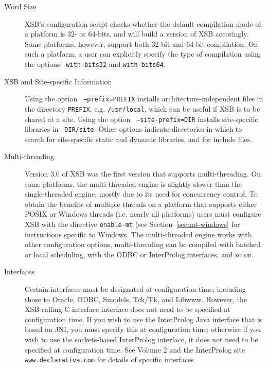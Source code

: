 \begin{description}
\item[Word Size] XSB's configuration script checks whether the default
  compilation mode of a platform is 32- or 64-bits, and will build a
  version of XSB accoringly.  Some platforms, however, support both
  32-bit and 64-bit compilation.  On such a platform, a user can
  explicitly specify the type of compilation using the options {\tt
    with-bits32} and {\tt with-bits64}.  

\item[XSB and Site-specific Information] Using the option {\tt
  --prefix=PREFIX} installs architecture-independent files in the
  directory {\tt PREFIX}, e.g. {\tt /usr/local}, which can be useful
  if XSB is to be shared at a site.  Using the option {\tt
    --site-prefix=DIR} installs site-specific libraries in {\tt
    DIR/site}.  Other options indicate directories in which to search
  for site-specific static and dynamic libraries, and for include
  files.

\item[Multi-threading] Version 3.0 of XSB was the first version that
  supports multi-threading.  On some platforms, the multi-threaded
  engine is slightly slower than the single-threaded engine, mostly
  due to its need for concurrency control.  To obtain the benefits of
  multiple threads on a platform that supports either POSIX or Windows
  threads (i.e.  nearly all platforms) users must configure XSB with
  the directive {\tt enable-mt} (see Section~\ref{sec:mt-windows} for
  instructions specific to Windows. The multi-threaded engine works
  with other configuration options, multi-threading can be compiled
  with batched or local scheduling, with the ODBC or InterProlog
  interfaces, and so on.


\item[Interfaces] Certain interfaces must be designated at
configuration time, including those to Oracle, ODBC, Smodels, Tck/Tk,
and Libwww.  However, the XSB-calling-C interface interface does not
need to be specified at configuration time.  If you wish to use the
InterProlog Java interface that is based on JNI, you must
specify this at configuration time; otherwise if you wish to use the
sockets-based InterProlog interface, it does not need to be specified
at configuration time.  See Volume 2 and the InterProlog site {\tt
www.declarativa.com} for details of specific interfaces


\end{description}
